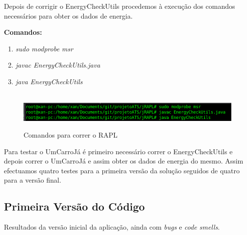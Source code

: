 Depois de corrigir o EnergyCheckUtils procedemos à execução dos comandos necessários para obter os dados de energia.\newline
 \par\textbf{Comandos:}

 \begin{enumerate}
 \item \textit{sudo modprobe msr}
 \item \textit{javac EnergyCheckUtils.java} 
 \item \textit{java EnergyCheckUtils}
\end{enumerate}


\begin{figure}[H]
    \hbox{\hspace{-8em} \includegraphics[width=1.5\textwidth]{images/rapl_run.png}}
    \label{fig51}
    \caption{Comandos para correr o RAPL}
\end{figure}

\par Para testar o UmCarroJá é primeiro necessário correr o EnergyCheckUtils e depois correr o UmCarroJá e assim obter os dados de energia do mesmo. Assim efectuamos quatro testes para a primeira versão da solução seguidos de quatro para a versão final.\newline



\subsection{Primeira Versão do Código}\hfill
\newline
\par Resultados da versão inicial da aplicação, ainda com \textit{bugs} e \textit{code smells}.\newline

